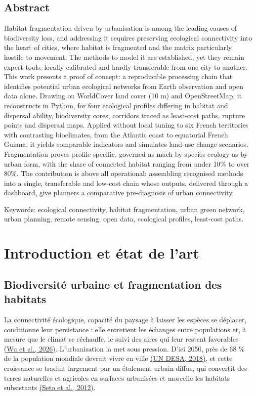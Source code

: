 \documentclass[a4paper,11pt]{report}
\begin{document}
\section*{Abstract}

Habitat fragmentation driven by urbanisation is among the leading causes of biodiversity loss, and addressing it requires preserving ecological connectivity into the heart of cities, where habitat is fragmented and the matrix particularly hostile to movement. The methods to model it are established, yet they remain expert tools, locally calibrated and hardly transferable from one city to another. This work presents a proof of concept: a reproducible processing chain that identifies potential urban ecological networks from Earth observation and open data alone. Drawing on WorldCover land cover (10 m) and OpenStreetMap, it reconstructs in Python, for four ecological profiles differing in habitat and dispersal ability, biodiversity cores, corridors traced as least-cost paths, rupture points and dispersal maps. Applied without local tuning to six French territories with contrasting bioclimates, from the Atlantic coast to equatorial French Guiana, it yields comparable indicators and simulates land-use change scenarios. Fragmentation proves profile-specific, governed as much by species ecology as by urban form, with the share of connected habitat ranging from under 10\% to over 80\%. The contribution is above all operational: assembling recognised methods into a single, transferable and low-cost chain whose outputs, delivered through a dashboard, give planners a comparative pre-diagnosis of urban connectivity.

Keywords: ecological connectivity, habitat fragmentation, urban green network, urban planning, remote sensing, open data, ecological profiles, least-cost paths.

\chapter{Introduction et état de l'art}\label{chap:1}

\section{Biodiversité urbaine et fragmentation des habitats}\label{sec:1.1}

La connectivité écologique, capacité du paysage à laisser les espèces se déplacer, conditionne leur persistance : elle entretient les échanges entre populations et, à mesure que le climat se réchauffe, le suivi des aires qui leur restent favorables \hyperref[sec:bibliographie]{(Wu et al., 2026)}. L'urbanisation la met sous pression. D'ici 2050, près de 68 \% de la population mondiale devrait vivre en ville \hyperref[sec:bibliographie]{(UN DESA, 2018)}, et cette croissance se traduit largement par un étalement urbain diffus, qui convertit des terres naturelles et agricoles en surfaces urbanisées et morcelle les habitats subsistants \hyperref[sec:bibliographie]{(Seto et al., 2012)}.
\end{document}
